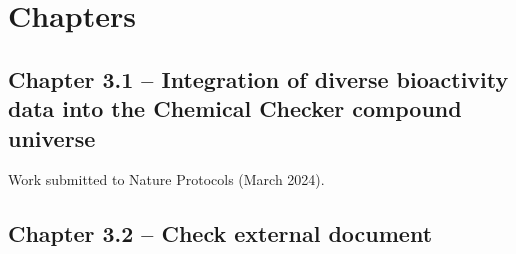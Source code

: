 
\chapter{Chapters}
\newpage


\section[Integration of diverse bioactivity data into the Chemical Checker compound universe]{Chapter 3.1 -- Integration of diverse bioactivity data into the Chemical Checker compound universe}
\setcounter{figure}{0}
\renewcommand{\thefigure}{3.\arabic{section}.\arabic{figure}}
\hspace*{\fill} Work submitted to Nature Protocols (March 2024).






\newpage



\section[A]{Chapter 3.2 -- Check external document}
\renewcommand{\thefigure}{3.\arabic{section}.\arabic{figure}}





\newpage




